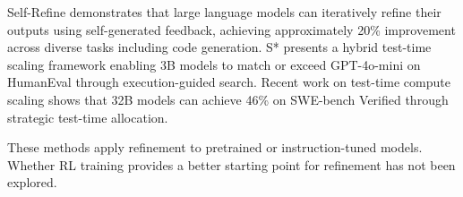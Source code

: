 
Self-Refine \citep{madaan2023selfrefine} demonstrates that large language models can iteratively refine their outputs using self-generated feedback, achieving approximately 20\% improvement across diverse tasks including code generation. S* \citep{li2025sstar} presents a hybrid test-time scaling framework enabling 3B models to match or exceed GPT-4o-mini on HumanEval through execution-guided search. Recent work on test-time compute scaling \citep{ma2025testtimescaling} shows that 32B models can achieve 46\% on SWE-bench Verified through strategic test-time allocation.

These methods apply refinement to pretrained or instruction-tuned models. Whether RL training provides a better starting point for refinement has not been explored.
